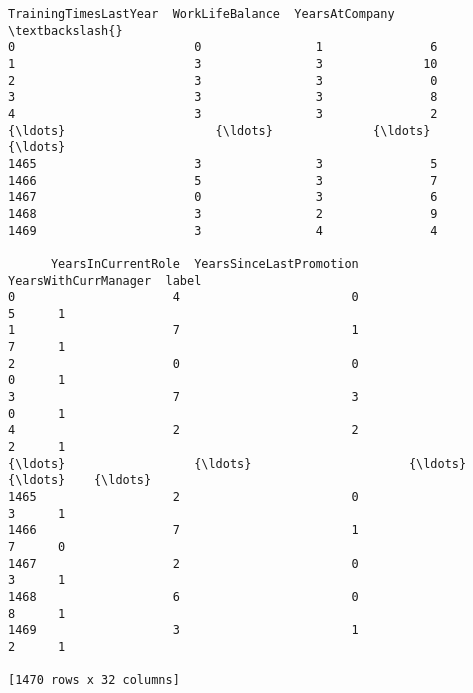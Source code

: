 \documentclass[11pt]{article}
\begin{document}
\begin{tcolorbox}[breakable, size=fbox, boxrule=.5pt, pad at break*=1mm, opacityfill=0]
\begin{Verbatim}[commandchars=\\\{\}]
      TrainingTimesLastYear  WorkLifeBalance  YearsAtCompany  \textbackslash{}
0                         0                1               6
1                         3                3              10
2                         3                3               0
3                         3                3               8
4                         3                3               2
{\ldots}                     {\ldots}              {\ldots}             {\ldots}
1465                      3                3               5
1466                      5                3               7
1467                      0                3               6
1468                      3                2               9
1469                      3                4               4

      YearsInCurrentRole  YearsSinceLastPromotion  YearsWithCurrManager  label
0                      4                        0                     5      1
1                      7                        1                     7      1
2                      0                        0                     0      1
3                      7                        3                     0      1
4                      2                        2                     2      1
{\ldots}                  {\ldots}                      {\ldots}                   {\ldots}    {\ldots}
1465                   2                        0                     3      1
1466                   7                        1                     7      0
1467                   2                        0                     3      1
1468                   6                        0                     8      1
1469                   3                        1                     2      1

[1470 rows x 32 columns]
\end{Verbatim}
\end{tcolorbox}
        
\end{document}
